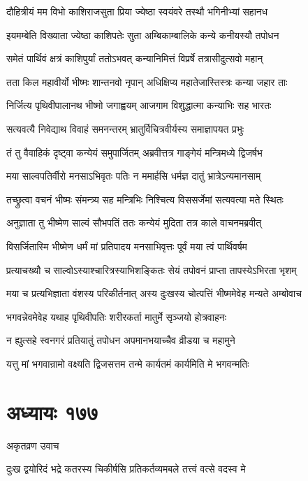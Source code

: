 \twolineshloka
{दौहित्रीयं मम विभो काशिराजसुता प्रिया}
{ज्येष्ठा स्वयंवरे तस्थौ भगिनीभ्यां सहानध}


\twolineshloka
{इयमम्बेति विख्याता ज्येष्ठा काशिपतेः सुता}
{अम्बिकाम्बालिके कन्ये कनीयस्यौ तपोधन}


\twolineshloka
{समेतं पार्थिवं क्षत्रं काशिपुर्यां ततोऽभवत्}
{कन्यानिमित्तं विप्रर्षे तत्रासीदुत्सवो महान्}


\twolineshloka
{तता किल महावीर्यो भीष्मः शान्तनवो नृपान्}
{अधिक्षिप्य महातेजास्तिस्त्रः कन्या जहार ताः}


\twolineshloka
{निर्जित्य पृथिवीपालानथ भीष्मो जगाह्वयम्}
{आजगाम विशुद्धात्मा कन्याभिः सह भारतः}


\twolineshloka
{सत्यवत्यै निवेद्याथ विवाहं समनन्तरम्}
{भ्रातुर्विचित्रवीर्यस्य समाज्ञापयत प्रभुः}


\twolineshloka
{तं तु वैवाहिकं दृष्ट्वा कन्येयं समुपार्जितम्}
{अब्रवीत्तत्र गाङ्गेयं मन्त्रिमध्ये द्विजर्षभ}


\twolineshloka
{मया साल्वपतिर्वीरो मनसाऽभिवृतः पतिः}
{न ममार्हसि धर्मज्ञ दातुं भ्रात्रेऽन्यमानसाम्}


\twolineshloka
{तच्छ्रुत्वा वचनं भीष्मः संमन्त्र्य सह मन्त्रिभिः}
{निश्चित्य विससर्जेमां सत्यवत्या मते स्थितः}


\twolineshloka
{अनुज्ञाता तु भीष्मेण साल्वं सौभपतिं ततः}
{कन्येयं मुदिता तत्र काले वाचनमब्रवीत्}


\twolineshloka
{विसर्जितास्मि भीष्मेण धर्मं मां प्रतिपादय}
{मनसाभिवृत्तः पूर्वं मया त्वं पार्थिवर्षम}


\twolineshloka
{प्रत्याचख्यौ च साल्वोऽस्याश्चारित्रस्याभिशङ्कितः}
{सेयं तपोवनं प्राप्ता तापस्येऽभिरता भृशम्}


\fourlineindentedshloka
{मया च प्रत्यभिज्ञाता वंशस्य परिकीर्तनात्}
{अस्य दुःखस्य चोत्पत्तिं भीष्ममेवेह मन्यते}
{अम्बोवाच}
{}


\twolineshloka
{भगवन्नेवमेवेह यथाह पृथिवीपतिः}
{शरीरकर्ता मातुर्मे सृञ्जयो होत्रवाहनः}


\twolineshloka
{न ह्युत्सहे स्वनगरं प्रतियातुं तपोधन}
{अपमानभयाच्चैव व्रीडया च महामुने}


\twolineshloka
{यत्तु मां भगवान्रामो वक्ष्यति द्विजसत्तम}
{तन्मे कार्यतमं कार्यमिति मे भगवन्मतिः}


\chapter{अध्यायः १७७}
\twolineshloka
{अकृतव्रण उवाच}
{}


\twolineshloka
{दुःख द्वयोरिदं भद्रे कतरस्य चिकीर्षसि}
{प्रतिकर्तव्यमबले तत्त्वं वत्से वदस्व मे}


